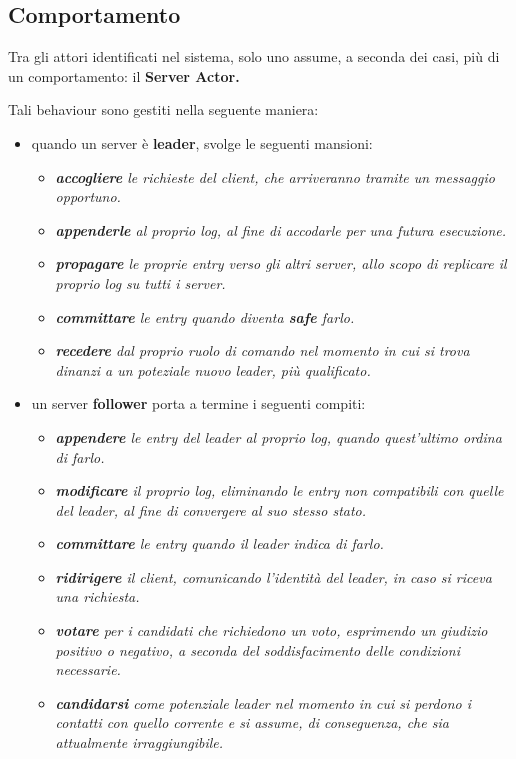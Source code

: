 \subsection{Comportamento}
Tra gli attori identificati nel sistema, solo uno assume, a seconda dei casi, più di un comportamento: il \textbf{Server Actor.}

Tali behaviour sono gestiti nella seguente maniera:
\begin{itemize}
	\item quando un server è \textbf{leader}, svolge le seguenti mansioni:
	\begin{itemize}
		\item \emph{\textbf{accogliere} le richieste del client, che arriveranno tramite un messaggio opportuno.}
		\item \emph{\textbf{appenderle} al proprio log, al fine di accodarle per una futura esecuzione.}
		\item \emph{\textbf{propagare} le proprie entry verso gli altri server, allo scopo di replicare il proprio log su tutti i server.} 
		\item \emph{\textbf{committare} le entry quando diventa \textbf{safe} farlo.}  
		\item \emph{\textbf{recedere} dal proprio ruolo di comando nel momento in cui si trova dinanzi a un poteziale nuovo leader, più qualificato.}
	\end{itemize}
	\item un server \textbf{follower} porta a termine i seguenti compiti:
	\begin{itemize}
		\item \emph{\textbf{appendere} le entry del leader al proprio log, quando quest'ultimo ordina di farlo.}
		\item \emph{\textbf{modificare} il proprio log, eliminando le entry non compatibili con quelle del leader, al fine di convergere al suo stesso stato.}
		\item \emph{\textbf{committare} le entry quando il leader indica di farlo.}
		\item \emph{\textbf{ridirigere} il client, comunicando l'identità del leader, in caso si riceva una richiesta.}
		\item \emph{\textbf{votare} per i candidati che richiedono un voto, esprimendo un giudizio positivo o negativo, a seconda del soddisfacimento delle condizioni necessarie.}		\item \emph{\textbf{candidarsi} come potenziale leader nel momento in cui si perdono i contatti con quello corrente e si assume, di conseguenza, che sia attualmente irraggiungibile.}
	\end{itemize}


\end{itemize}
